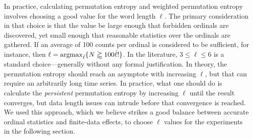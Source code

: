 \documentclass[%
pre,
reprint,
superscriptaddress,
showpacs,
nofootinbib,
nobibnotes,
 amsmath,amssymb,
 aps,
]{revtex4-1}
\begin{document}
In practice, calculating permutation entropy and weighted permutation
entropy involves choosing a good value for the word length $\ell$. The
primary consideration in that choice is that the value be large enough
that forbidden ordinals are discovered, yet small enough that
reasonable statistics over the ordinals are gathered.  If an average
of 100 counts per ordinal is considered to be sufficient, for
instance, then $\ell = \operatornamewithlimits{argmax}_{\hat{\ell}} \{
N \gtrapprox 100 \hat{\ell}! \}$.  In the literature, $3 \le \ell \le
6$ is a standard choice---generally without any formal justification.
In theory, the permutation entropy should reach an asymptote with
increasing $\ell$, but that can require an arbitrarily long time
series. In practice, what one should do is calculate the
\emph{persistent} permutation entropy by increasing $\ell$ until the
result converges, but data length issues can intrude before that
convergence is reached.  We used this approach, which we believe
strikes a good balance between accurate ordinal statistics and
finite-data effects, to choose $\ell$ values for the experiments in
the following section.

\end{document}
